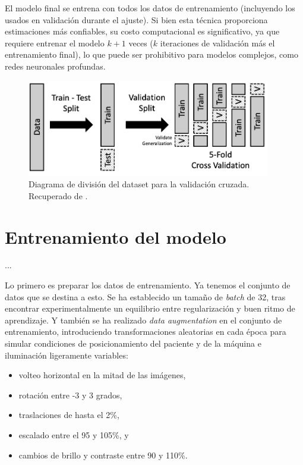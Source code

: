 El modelo final se entrena con todos los datos de entrenamiento (incluyendo los usados en validación durante 
el ajuste). Si bien esta técnica proporciona estimaciones más confiables, su costo computacional es 
significativo, ya que requiere entrenar el modelo $k+1$ veces ($k$ iteraciones de validación más el 
entrenamiento final), lo que puede ser prohibitivo para modelos complejos, como redes neuronales profundas.

\begin{figure}[h]
    \centering
    \includegraphics[width=0.95\textwidth]{capitulos/cap_05/imagenes/CVDiagram.png}
    \caption{
        Diagrama de división del dataset para la validación cruzada. 
        Recuperado de \cite{lau2023crossvalidation}.
    } 
    \label{fig:CVDiagram}
\end{figure}


\section{Entrenamiento del modelo}

...

Lo primero es preparar los datos de entrenamiento. Ya tenemos el conjunto de datos que se destina a esto. 
Se ha establecido un tamaño de \textit{batch} de 32, tras encontrar experimentalmente un equilibrio entre 
regularización y buen ritmo de aprendizaje. 
Y también se ha realizado \textit{data augmentation} en el conjunto de entrenamiento, introduciendo 
transformaciones aleatorias en cada época para simular condiciones de posicionamiento del paciente y de la 
máquina e iluminación ligeramente variables: 
\begin{itemize}
    \item volteo horizontal en la mitad de las imágenes,
    \item rotación entre -3 y 3 grados,
    \item traslaciones de hasta el 2\%,
    \item escalado entre el 95 y 105\%, y
    \item cambios de brillo y contraste entre 90 y 110\%. 
\end{itemize}

